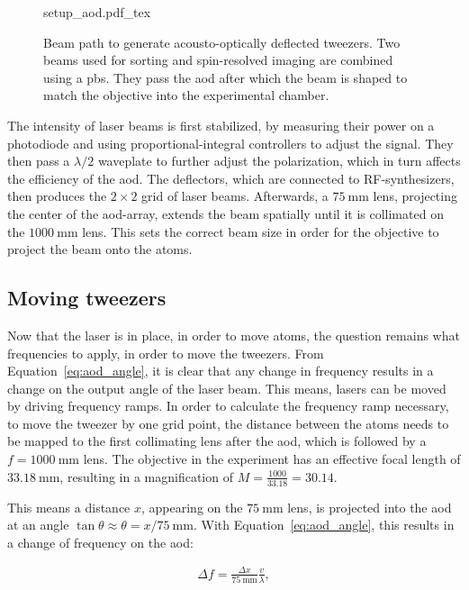 \begin{figure}[t]%
\centering
{setup_aod.pdf_tex}
\caption{Beam path to generate acousto-optically deflected tweezers. Two beams used for sorting and spin-resolved imaging are combined using a \ac{pbs}. They pass the \ac{aod} after which the beam is shaped to match the objective into the experimental chamber.}%
\label{fig:setup_aod}
\end{figure}

The intensity of laser beams is first stabilized, by measuring their power on a photodiode and using proportional-integral controllers to adjust the signal. They then pass a $\lambda/2$ waveplate to further adjust the polarization, which in turn affects the efficiency of the \ac{aod}. The deflectors, which are connected to RF-synthesizers, then produces the $2\times2$ grid of laser beams. Afterwards, a $\SI{75}{\milli\meter}$ lens, projecting the center of the \ac{aod}-array, extends the beam spatially until it is collimated on the $\SI{1000}{\milli\meter}$ lens. This sets the correct beam size in order for the objective to project the beam onto the atoms.

\subsection{Moving tweezers}

Now that the laser is in place, in order to move atoms, the question remains what frequencies to apply, in order to move the tweezers. From Equation~\ref{eq:aod_angle}, it is clear that any change in frequency results in a change on the output angle of the laser beam. This means, lasers can be moved by driving frequency ramps. In order to calculate the frequency ramp necessary, to move the tweezer by one grid point, the distance between the atoms needs to be mapped to the first collimating lens after the \ac{aod}, which is followed by a $f=\SI{1000}{\milli\meter}$ lens. The objective in the experiment has an effective focal length of $\SI{33.18}{\milli\meter}$, resulting in a magnification of $M = \frac{1000}{33.18} = 30.14$.

This means a distance $x$, appearing on the $\SI{75}{\milli\meter}$ lens, is projected into the \ac{aod} at an angle $\tan{\theta} \approx \theta = x / \SI{75}{\milli\meter}$. With Equation~\ref{eq:aod_angle}, this results in a change of frequency on the \ac{aod}:

\begin{align}
	\Delta f = \frac{\Delta x}{\SI{75}{\milli\meter}} \frac{v}{\lambda},
\end{align}

